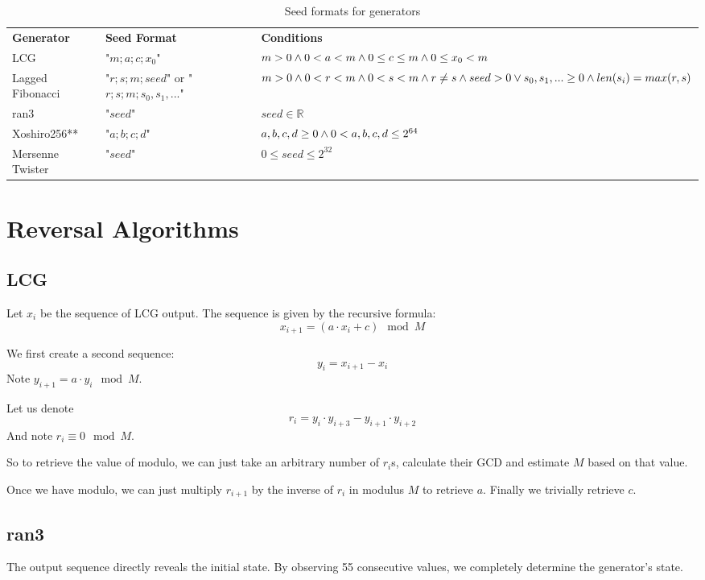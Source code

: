 \documentclass[12pt, a4paper]{report}
\begin{document}
\begin{table}
\begin{xltabular}{\textwidth}{| >{\raggedright\arraybackslash}X | >{\raggedright\arraybackslash}X | >{\raggedright\arraybackslash}X |}
	\caption{Seed formats for generators}
	\label{table:1}\\
	\hline
	\bf{Generator} & \bf{Seed Format} & \bf{Conditions} \\
	\hhline{|=|=|=|}
	LCG & 
	"$m;a;c;x_0$" & 
	$m > 0 \wedge\break 0 < a < m \wedge\break 0\leq c \leq m \wedge\break 0 \leq x_0 < m$\\
	\hline
	Lagged Fibonacci & 
	"$r;s;m;seed$" or \break "$r;s;m;s_0, s_1, ...$" & 
	$m > 0 \wedge\break 0 < r < m \wedge\break 0 < s < m \wedge\break r \neq s \wedge\break\break seed > 0 \vee\break
	s_0, s_1, ... \geq 0 \wedge\break len(s_i) = max(r, s)$\\
	\hline
	ran3 &
	"$seed$" & 
  $seed \in \mathds{R}$\\
	\hline
	Xoshiro256** &
	"$a;b;c;d$" & 
	$a,b,c,d \ge 0 \wedge\break 0 < a,b,c,d \leq 2^{64}$ \\
	\hline
	Mersenne Twister&
	"$seed$" &
	$0 \leq seed \leq 2^{32}$ \\
	\hline
\end{xltabular}
\end{table}

\chapter{Reversal Algorithms}
\section{LCG}
Let $x_i$ be the sequence of LCG output. The sequence is given by the recursive formula:
$$x_{i+1} = (a \cdot x_i + c) \mod M$$

We first create a second sequence:
$$y_{i} = x_{i+1} - x_{i}$$ Note $y_{i+1} = a \cdot y_{i} \mod M$.

Let us denote $$r_i = y_{i} \cdot y_{i+3} - y_{i+1} \cdot y_{i+2}$$
And note $r_i \equiv 0 \mod M$.

So to retrieve the value of modulo, we can just take an arbitrary number of $r_i$s, calculate their GCD and estimate $M$ based on that value.

Once we have modulo, we can just multiply $r_{i+1}$ by the inverse of $r_{i}$ in modulus $M$ to retrieve $a$. Finally we trivially retrieve $c$.

\section{ran3}
The output sequence directly reveals the initial state. By observing 55 consecutive values, we completely determine the generator's state.
\end{document}

